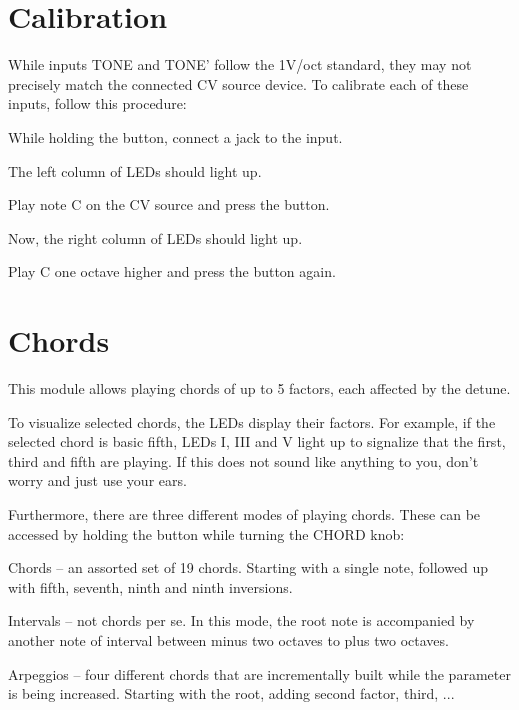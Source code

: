 \documentclass[10pt,nofoldmark,nocombine]{leaflet} %
\newenvironment{packed_enumerate}{
\begin{enumerate}
  \setlength{\itemsep}{1pt}
  \setlength{\parskip}{0pt}
  \setlength{\parsep}{0pt}
}{\end{enumerate}}
\newenvironment{packed_enumerate_i}{
\begin{enumerate}[I]
  \setlength{\itemsep}{1pt}
  \setlength{\parskip}{0pt}
  \setlength{\parsep}{0pt}
}{\end{enumerate}}
\begin{document}
\section{Calibration}

While inputs TONE and TONE' follow the 1V/oct standard, they may not precisely match the connected CV source device. To calibrate each of these inputs, follow this procedure:

\begin{packed_enumerate}
  \item While holding the button, connect a jack to the input.
  \item The left column of LEDs should light up.
  \item Play note C on the CV source and press the button.
  \item Now, the right column of LEDs should light up.
  \item Play C one octave higher and press the button again.
\end{packed_enumerate}

\section{Chords}

This module allows playing chords of up to 5 factors, each affected by the detune.

To visualize selected chords, the LEDs display their factors. For example, if the selected chord is basic fifth, LEDs I, III and V light up to signalize that the first, third and fifth are playing. If this does not sound like anything to you, don't worry and just use your ears.

Furthermore, there are three different modes of playing chords. These can be accessed by holding the button while turning the CHORD knob:

\begin{packed_enumerate_i}
  \item Chords -- an assorted set of 19 chords. Starting with a single note, followed up with fifth, seventh, ninth and ninth inversions.
  \item Intervals -- not chords per se. In this mode, the root note is accompanied by another note of interval between minus two octaves to plus two octaves.
  \item Arpeggios -- four different chords that are incrementally built while the parameter is being increased. Starting with the root, adding second factor, third, ...
\end{packed_enumerate_i}
\end{document}
